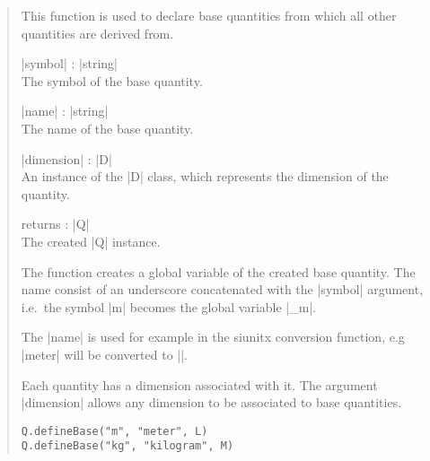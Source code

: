 \documentclass{ltxdoc}
\begin{document}
\begin{quote}
  This function is used to declare base quantities from which all other quantities are derived from.

  \begin{description}
  \item |symbol| : |string|\\
    The symbol of the base quantity.

  \item |name| : |string|\\
    The name of the base quantity.

  \item |dimension| : |D|\\
    An instance of the |D| class, which represents the dimension of the quantity.

  \item returns : |Q|\\
    The created |Q| instance.
  \end{description}

  The function creates a global variable of the created base quantity. The name consist of an underscore concatenated with the |symbol| argument, i.e.\ the symbol |m| becomes the global variable |_m|.

  The |name| is used for example in the siunitx conversion function, e.g |meter| will be converted to |\meter|.

  Each quantity has a dimension associated with it. The argument |dimension| allows any dimension to be associated to base quantities.

  \begin{lstlisting}
Q.defineBase("m", "meter", L)
Q.defineBase("kg", "kilogram", M)
  \end{lstlisting}
\end{quote}
\end{document}
